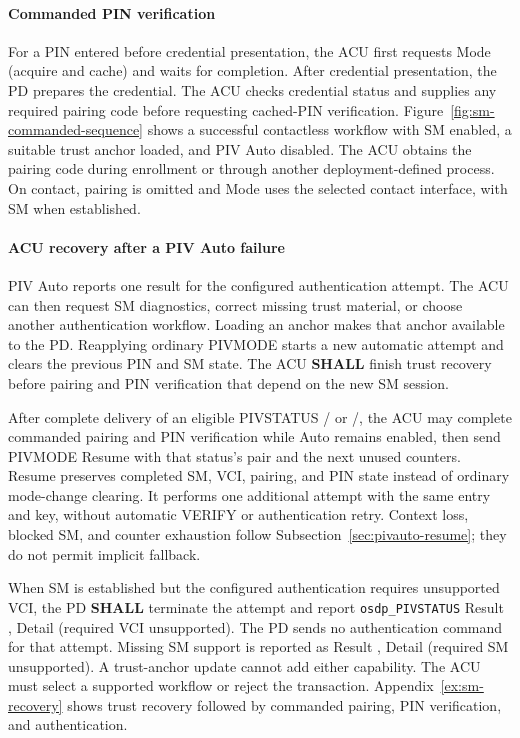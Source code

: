 



\paragraph{Commanded PIN verification}
For a PIN entered before credential presentation, the ACU first requests Mode
 (acquire and cache) and waits for completion. After credential presentation,
the PD prepares the credential. The ACU checks credential status and supplies any required
pairing code before requesting cached-PIN verification.
Figure~\ref{fig:sm-commanded-sequence} shows a successful contactless workflow
with SM enabled, a suitable trust anchor loaded, and PIV Auto disabled.
The ACU obtains the pairing code during enrollment or through another
deployment-defined process. On contact, pairing is omitted
and Mode  uses the selected contact interface, with SM when established.



\paragraph{ACU recovery after a PIV Auto failure}
PIV Auto reports one result for the configured authentication attempt. The ACU
can then request SM diagnostics, correct missing trust material, or choose
another authentication workflow. Loading an anchor makes that anchor available
to the PD. Reapplying ordinary PIVMODE starts a new automatic attempt and clears the
previous PIN and SM state. The ACU \textbf{SHALL} finish trust recovery before
pairing and PIN verification that depend on the new SM session.

After complete delivery of an eligible PIVSTATUS / or
/, the ACU may complete commanded pairing and PIN verification
while Auto remains enabled, then send PIVMODE Resume with that status's pair and the next
unused counters. Resume preserves completed SM, VCI, pairing, and PIN state instead of
ordinary mode-change clearing. It performs one additional attempt with the same entry and
key, without automatic VERIFY or authentication retry. Context loss, blocked SM, and counter
exhaustion follow Subsection~\ref{sec:pivauto-resume}; they do not permit implicit fallback.

When SM is established but the configured authentication requires unsupported
VCI, the PD \textbf{SHALL} terminate the attempt and report
\texttt{osdp\_PIVSTATUS} Result , Detail  (required VCI
unsupported). The PD sends no authentication command for that attempt.
Missing SM support is reported as Result , Detail 
(required SM unsupported). A trust-anchor update cannot add either capability.
The ACU must select a supported workflow or reject the transaction.
Appendix~\ref{ex:sm-recovery} shows trust recovery followed by commanded
pairing, PIN verification, and authentication.
